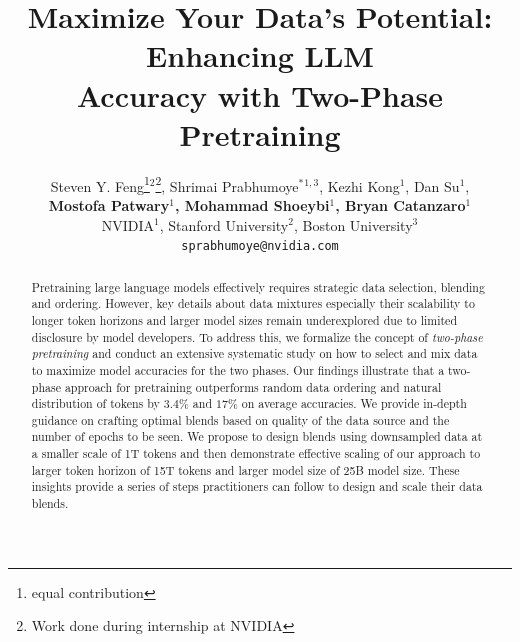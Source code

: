 \documentclass[11pt]{article}
\title{Maximize Your Data's Potential: Enhancing LLM \\Accuracy with Two-Phase Pretraining %
}
\author{Steven Y. Feng\thanks{equal contribution}$^{2}$\thanks{Work done during internship at NVIDIA}, Shrimai Prabhumoye$^{*}$$^{1,3}$, Kezhi Kong$^{1}$, Dan Su$^{1}$, \\ \textbf{Mostofa Patwary$^{1}$, Mohammad Shoeybi$^{1}$, Bryan Catanzaro$^{1}$} \\
NVIDIA$^{1}$, Stanford University$^{2}$, Boston University$^{3}$ \\
  \texttt{sprabhumoye@nvidia.com} \\}
\newcommand{\mostofa}[1]{{\color{blue}\bf [MP: #1]}\xspace}
\newcommand{\gainRO}{$3.4$\%\xspace}
\newcommand{\gainND}{$17$\%\xspace}
\begin{document}
\maketitle
\begin{abstract}
    Pretraining large language models effectively requires strategic data selection, blending and ordering. 
    However, key details about data mixtures especially their scalability to longer token horizons and larger model sizes remain underexplored due to limited disclosure by model developers.
    To address this, we formalize the concept of \textit{two-phase pretraining} and conduct an extensive systematic study on how to select and mix data to maximize model accuracies for the two phases.
    Our findings illustrate that a two-phase approach for pretraining outperforms random data ordering and natural distribution of tokens by \gainRO and \gainND on average accuracies.
    We provide in-depth guidance on crafting optimal blends based on quality of the data source and the number of epochs to be seen.
    We propose to design blends using downsampled data at a smaller scale of 1T tokens and then demonstrate effective scaling of our approach to larger token horizon of 15T tokens and larger model size of 25B model size.
    These insights provide a series of steps practitioners can follow to design and scale their data blends.
   
\end{abstract}
\end{document}
